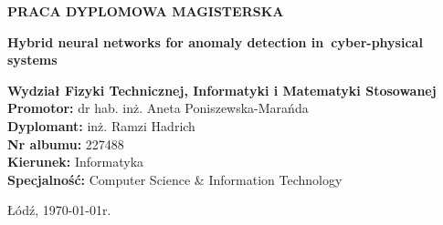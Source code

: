 \pagestyle{empty}
\begin{center}

{\large \textbf{PRACA DYPLOMOWA MAGISTERSKA}}
\vspace{6cm}


{\fontsize{18}{18}\selectfont \textbf{Hybrid neural networks for anomaly detection in~cyber-physical systems}}
\end{center}
\normalsize

\vspace{6cm}
\textbf{Wydział Fizyki Technicznej, Informatyki i Matematyki Stosowanej \\
Promotor:} dr hab. inż. Aneta Poniszewska-Marańda\\
\textbf{Dyplomant:} inż. Ramzi Hadrich\\
\textbf{Nr albumu:} 227488\\
\textbf{Kierunek:} Informatyka\\
\textbf{Specjalność:} Computer Science \& Information Technology\\
\begin{center}
    Łódź, \today r.
\end{center}


